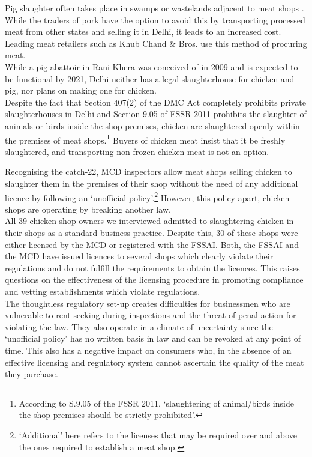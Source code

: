 \documentclass[a4paper, 12pt]{article}
\begin{document}
Pig slaughter often takes place in swamps or wastelands adjacent to meat shops \parencite{tnnnews}. While the traders of pork have the option to avoid this by transporting processed meat from other states and selling it in Delhi, it leads to an increased cost. Leading meat retailers such as Khub Chand \& Bros. use this method of procuring meat.\\

While a pig abattoir in Rani Khera was conceived of in 2009 and is expected to be functional by 2021, Delhi neither has a legal slaughterhouse for chicken and pig, nor plans on making one for chicken. \\

Despite the fact that Section 407(2) of the DMC Act completely prohibits private slaughterhouses in Delhi and Section 9.05 of FSSR 2011 prohibits the slaughter of animals or birds inside the shop premises, chicken are slaughtered openly within the premises of meat shops.\footnote{According to S.9.05 of the FSSR 2011, ‘slaughtering of animal/birds inside the shop premises should be strictly prohibited’.} Buyers of chicken meat insist that it be freshly slaughtered, and transporting non-frozen chicken meat is not an option.

Recognising the catch-22, MCD inspectors allow meat shops selling chicken to slaughter them in the premises of their shop without the need of any additional licence by following an ‘unofficial policy’.\footnote{‘Additional’ here refers to the licenses that may be required over and above the ones required to establish a meat shop.} However, this policy apart, chicken shops are operating by breaking another law. \\

All 39 chicken shop owners we interviewed admitted to slaughtering chicken in their shops as a standard business practice. Despite this, 30 of these shops were either licensed by the MCD or registered with the FSSAI. Both, the FSSAI and the MCD have issued licences to several shops which clearly violate their regulations and do not fulfill the requirements to obtain the licences. This raises questions on the effectiveness of the licensing procedure in promoting compliance and vetting establishments which violate regulations. \\

The thoughtless regulatory set-up creates difficulties for businessmen who are vulnerable to rent seeking during inspections and the threat of penal action for violating the law. They also operate in a climate of uncertainty since the ‘unofficial policy’ has no written basis in law and can be revoked at any point of time. This also has a negative impact on consumers who, in the absence of an effective licensing and regulatory system cannot ascertain the quality of the meat they purchase. \\
\end{document}
